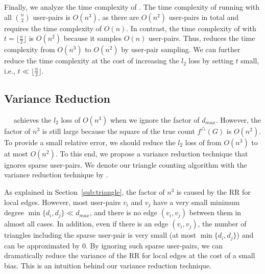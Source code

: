 Finally, we analyze the time complexity of \AlgWSTri{}. 
The time complexity of running \AlgWSLE{} with all $\binom{n}{2}$ user-pairs is $O(n^3)$, as there are $O(n^2)$ user-pairs in total and \AlgWSLE{} requires the time complexity of $O(n)$. 
In contrast, the time complexity of \AlgWSTri{} with $t = \lfloor \frac{n}{2} \rfloor$ is $O(n^2)$ because it samples $O(n)$ user-pairs. 
Thus, \AlgWSTri{} reduces the time complexity from $O(n^3)$ to $O(n^2)$ by user-pair sampling. 
We can further reduce the time complexity at the cost of increasing the $l_2$ loss 
by setting $t$ small, 
i.e., $t \ll \lfloor \frac{n}{2} \rfloor$. 

\subsection{Variance Reduction}
\label{sub:var_red}
~~\AlgWSTri{} 
achieves the $l_2$ loss of $O(n^3)$ when we ignore the factor of $d_{max}$. 
However, the factor of $n^3$ is still large because the square of the true count $f^\triangle(G)$ is $O(n^2)$. 
To provide a small relative error, we should reduce the $l_2$ loss of \AlgWSTri{} from $O(n^3)$ to at most $O(n^2)$. 
To this end, we propose a variance reduction technique that ignores sparse user-pairs. 
We denote our triangle counting algorithm with the variance reduction technique by \AlgWSTriVR{}. 

As explained in Section~\ref{sub:triangle}, the factor of $n^3$ is caused by the RR for local edges. 
However, most user-pairs $v_i$ and $v_j$ have a very small minimum degree 
$\min\{d_i, d_j\} \ll d_{max}$, 
and there is no edge $(v_i, v_j)$ between them in almost all cases. 
In addition, even if there is an edge $(v_i, v_j)$, the number of triangles including the sparse user-pair is very small 
(at most $\min\{d_i, d_j\}$) 
and can be approximated by $0$. 
By ignoring such sparse user-pairs, we can dramatically reduce the variance of the RR for local edges at the cost of a small bias. 
This is an intuition behind our variance reduction technique. 

